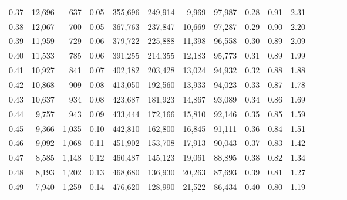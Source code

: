\begin{tabular}{rrrcrrrrrrrrrrr}
0.37 &  12,696 &    637 &                                       0.05 &  355,696 &  249,914 &    9,969 &   97,987 &  0.28 &  0.91 &                         2.31 \\
0.38 &  12,067 &    700 &                                       0.05 &  367,763 &  237,847 &   10,669 &   97,287 &  0.29 &  0.90 &                         2.20 \\
0.39 &  11,959 &    729 &                                       0.06 &  379,722 &  225,888 &   11,398 &   96,558 &  0.30 &  0.89 &                         2.09 \\
0.40 &  11,533 &    785 &                                       0.06 &  391,255 &  214,355 &   12,183 &   95,773 &  0.31 &  0.89 &                         1.99 \\
0.41 &  10,927 &    841 &                                       0.07 &  402,182 &  203,428 &   13,024 &   94,932 &  0.32 &  0.88 &                         1.88 \\
0.42 &  10,868 &    909 &                                       0.08 &  413,050 &  192,560 &   13,933 &   94,023 &  0.33 &  0.87 &                         1.78 \\
0.43 &  10,637 &    934 &                                       0.08 &  423,687 &  181,923 &   14,867 &   93,089 &  0.34 &  0.86 &                         1.69 \\
0.44 &   9,757 &    943 &                                       0.09 &  433,444 &  172,166 &   15,810 &   92,146 &  0.35 &  0.85 &                         1.59 \\
0.45 &   9,366 &  1,035 &                                       0.10 &  442,810 &  162,800 &   16,845 &   91,111 &  0.36 &  0.84 &                         1.51 \\
0.46 &   9,092 &  1,068 &                                       0.11 &  451,902 &  153,708 &   17,913 &   90,043 &  0.37 &  0.83 &                         1.42 \\
0.47 &   8,585 &  1,148 &                                       0.12 &  460,487 &  145,123 &   19,061 &   88,895 &  0.38 &  0.82 &                         1.34 \\
0.48 &   8,193 &  1,202 &                                       0.13 &  468,680 &  136,930 &   20,263 &   87,693 &  0.39 &  0.81 &                         1.27 \\
0.49 &   7,940 &  1,259 &                                       0.14 &  476,620 &  128,990 &   21,522 &   86,434 &  0.40 &  0.80 &                         1.19 \\

\end{tabular}
